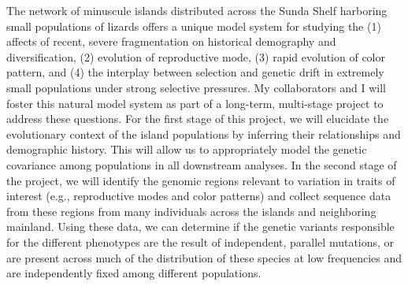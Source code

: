 The network of minuscule islands distributed across the Sunda Shelf harboring
small populations of lizards offers a unique model system for studying the 
(1) affects of recent, severe fragmentation on historical demography and
diversification,
(2) evolution of reproductive mode,
(3) rapid evolution of color pattern, and 
(4) the interplay between selection and genetic drift in extremely small
populations under strong selective pressures.
My collaborators and I will foster this natural model system as part of a
long-term, multi-stage project to address these questions.
For the first stage of this project, we will elucidate the evolutionary context
of the island populations by inferring their relationships and demographic
history.
This will allow us to appropriately model the genetic covariance among
populations in all downstream analyses.
In the second stage of the project, we will identify the genomic regions
relevant to variation in traits of interest (e.g., reproductive modes and color
patterns) and collect sequence data from these regions from many individuals
across the islands and neighboring mainland.
Using these data, we can determine if the genetic variants responsible for the
different phenotypes are the result of independent, parallel mutations, or are
present across much of the distribution of these species at low frequencies and
are independently fixed among different populations.
